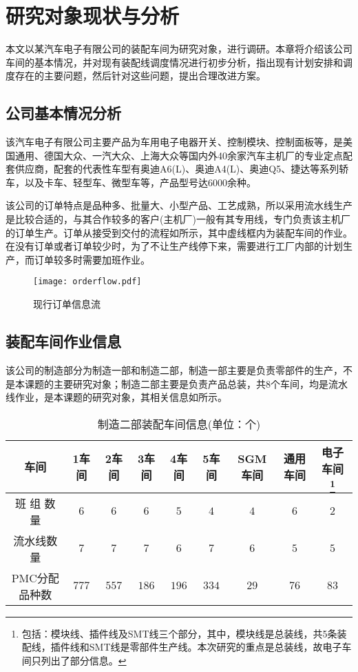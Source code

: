 \chapter{研究对象现状与分析}
本文以某汽车电子有限公司的装配车间为研究对象，进行调研。本章将介绍该公司车间的基本情况，并对现有装配线调度情况进行初步分析，指出现有计划安排和调度存在的主要问题，然后针对这些问题，提出合理改进方案。

\section{公司基本情况分析}
该汽车电子有限公司主要产品为车用电子电器开关、控制模块、控制面板等，是美国通用、德国大众、一汽大众、上海大众等国内外40余家汽车主机厂的专业定点配套供应商，配套的代表性车型有奥迪A6(L)、奥迪A4(L)、奥迪Q5、捷达等系列轿车，以及卡车、轻型车、微型车等，产品型号达6000余种。

该公司的订单特点是品种多、批量大、小型产品、工艺成熟，所以采用流水线生产是比较合适的，与其合作较多的客户(主机厂)一般有其专用线，专门负责该主机厂的订单生产。订单从接受到交付的流程如所示，其中虚线框内为装配车间的作业。在没有订单或者订单较少时，为了不让生产线停下来，需要进行工厂内部的计划生产，而订单较多时需要加班作业。
\begin{figure}[h]
\centering
\texttt{[image: orderflow.pdf]}
\caption{现行订单信息流\label{fig:orderflow}}
\end{figure}
\section{装配车间作业信息}
该公司的制造部分为制造一部和制造二部，制造一部主要是负责零部件的生产，不是本课题的主要研究对象；制造二部主要是负责产品总装，共8个车间，均是流水线作业，是本课题的研究对象，其相关信息如所示。
\begin{table}[htbp]
  \centering
  \caption{制造二部装配车间信息(单位：个)}
    \begin{tabular}{cccccccccc}
    \toprule
    \multicolumn{2}{c}{车间 } & 1车间   & 2车间   & 3车间   & 4车间   & 5车间   & SGM车间 & 通用车间  & 电子车间 \footnote{包括：模块线、插件线及SMT线三个部分，其中，模块线是总装线，共5条装配线，插件线和SMT线是零部件生产线。本次研究的重点是总装线，故电子车间只列出了部分信息。} \\
    \midrule
    \multicolumn{2}{c}{班 组 数 量} & $6$     & $6$     & $6$     & $5$     & $4$     & $4$     & $6$     & $2$ \\
    \multicolumn{2}{c}{流水线数量} & $7$     & $7$     & $7$     & $6$     & $7$     & $6$     & $5$     & $5$ \\
    \multicolumn{2}{c}{PMC分配品种数} & $777$   & $557$   & $186$   & $196$   & $334$   & $29$    & $76$    & $83$ \\
    \bottomrule
    \end{tabular}
  \label{tab:2jobshopinfo}
\end{table}

